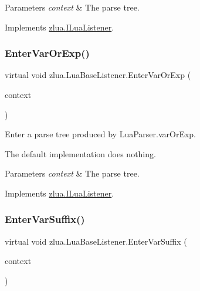 \begin{DoxyParams}{Parameters}
{\em context} & The parse tree.\\
\hline
\end{DoxyParams}


Implements \mbox{\hyperlink{interfacezlua_1_1_i_lua_listener_a6803c862c7298f17d74bfcda8f6f159e}{zlua.\+I\+Lua\+Listener}}.

\mbox{\label{classzlua_1_1_lua_base_listener_a0af6c7cb47cd8734025f965a6817bf12}} 
\subsubsection{\texorpdfstring{Enter\+Var\+Or\+Exp()}{EnterVarOrExp()}}
{\footnotesize\ttfamily virtual void zlua.\+Lua\+Base\+Listener.\+Enter\+Var\+Or\+Exp (\begin{DoxyParamCaption}\item[{\mbox{[}\+Not\+Null\mbox{]} \mbox{\hyperlink{classzlua_1_1_lua_parser_1_1_var_or_exp_context}{Lua\+Parser.\+Var\+Or\+Exp\+Context}}}]{context }\end{DoxyParamCaption})\hspace{0.3cm}{\ttfamily [virtual]}}



Enter a parse tree produced by Lua\+Parser.\+var\+Or\+Exp. 

The default implementation does nothing.


\begin{DoxyParams}{Parameters}
{\em context} & The parse tree.\\
\hline
\end{DoxyParams}


Implements \mbox{\hyperlink{interfacezlua_1_1_i_lua_listener_aece0cb0bc8e75c07d7bf71375714a6e7}{zlua.\+I\+Lua\+Listener}}.

\mbox{\label{classzlua_1_1_lua_base_listener_a743b7d8c5cc407d89b015a99597e711b}} 
\subsubsection{\texorpdfstring{Enter\+Var\+Suffix()}{EnterVarSuffix()}}
{\footnotesize\ttfamily virtual void zlua.\+Lua\+Base\+Listener.\+Enter\+Var\+Suffix (\begin{DoxyParamCaption}\item[{\mbox{[}\+Not\+Null\mbox{]} \mbox{\hyperlink{classzlua_1_1_lua_parser_1_1_var_suffix_context}{Lua\+Parser.\+Var\+Suffix\+Context}}}]{context }\end{DoxyParamCaption})\hspace{0.3cm}{\ttfamily [virtual]}}




